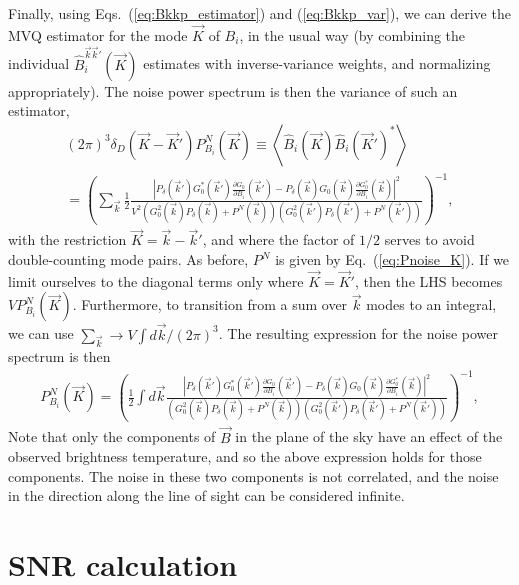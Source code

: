 \documentclass[12pt]{paper}
\newcommand{\beq}{\begin{equation}}
\newcommand{\eeq}{\end{equation}}
\newcommand{\bga}{\begin{gathered}}
\newcommand{\ega}{\end{gathered}}
\begin{document}
Finally, using Eqs.~(\ref{eq:Bkkp_estimator}) and (\ref{eq:Bkkp_var}), we can derive the MVQ estimator for the mode $\vec K$ of $B_i$, in the usual way (by combining the individual $\widehat B_i^{\vec k\vec k'}(\vec K)$ estimates with inverse-variance weights, and normalizing appropriately). The noise power spectrum is then the variance of such an estimator,
\beq
\bga
(2\pi)^3\delta_D(\vec K - \vec K') P^N_{B_i}(\vec K) \equiv \left< \widehat B_i(\vec K)\widehat B_i(\vec K')^*\right>\\
= \left( \sum_{\vec k} \frac{1}{2}\frac{\left|P_\delta(\vec k')G_0^*(\vec k')\frac{\partial G_0}{\partial B_i}(\vec k') - P_\delta(\vec k)G_0(\vec k)\frac{\partial G_0^*}{\partial B_i}(\vec k)\right|^2}{V^2\left(G^2_0(\vec k)P_\delta(\vec k) + P^N(\vec k)\right)\left(G^2_0(\vec k')P_\delta(\vec k') + P^N(\vec k')\right) } \right)^{-1},
\ega
\label{eq:NK1}
\eeq
with the restriction $\vec K=\vec k-\vec k'$, and where the factor of $1/2$ serves to avoid double-counting mode pairs. As before, $P^N$ is given by Eq.~(\ref{eq:Pnoise_K}). If we limit ourselves to the diagonal terms only where $\vec K=\vec K'$, then the LHS becomes $V P^N_{B_i}(\vec K)$. Furthermore, to transition from a sum over $\vec k$ modes to an integral, we can use $\sum_{\vec k} \to V\int d\vec k /(2\pi)^3$. The resulting expression for the noise power spectrum is then
\beq
\bga
P^N_{B_i}(\vec K) = \left(\frac{1}{2}\int d{\vec k} \frac{\left|P_\delta(\vec k')G_0^*(\vec k')\frac{\partial G_0}{\partial B_i}(\vec k') - P_\delta(\vec k)G_0(\vec k)\frac{\partial G_0^*}{\partial B_i}(\vec k)\right|^2}{\left(G^2_0(\vec k)P_\delta(\vec k) + P^N(\vec k)\right)\left(G^2_0(\vec k')P_\delta(\vec k') + P^N(\vec k')\right) } \right)^{-1},
\ega
\label{eq:NK}
\eeq
Note that only the components of $\vec B$ in the plane of the sky have an effect of the observed brightness temperature, and so the above expression holds for those components. The noise in these two components is not correlated, and the noise in the direction along the line of sight can be considered infinite.
\section{SNR calculation}
\label{sec:snr}
\end{document}
